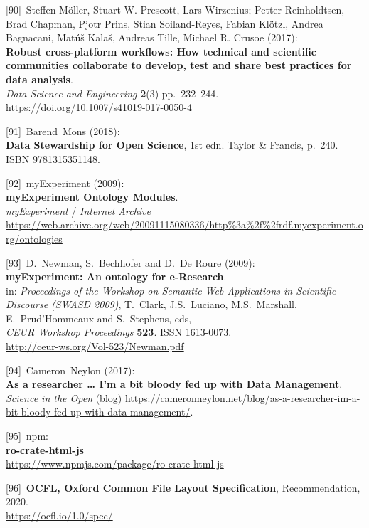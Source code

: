 {[}90{]}~Steffen Möller, Stuart W. Prescott, Lars Wirzenius; Petter
Reinholdtsen, Brad Chapman, Pjotr Prins, Stian Soiland-Reyes, Fabian
Klötzl, Andrea Bagnacani, Matúš Kalaš, Andreas Tille, Michael R. Crusoe
(2017):\\
\textbf{Robust cross-platform workflows: How technical and scientific
communities collaborate to develop, test and share best practices for
data analysis}.\\
\emph{Data Science and Engineering} \textbf{2}(3) pp.~232--244.\\
\url{https://doi.org/10.1007/s41019-017-0050-4}

{[}91{]}~Barend~Mons (2018):\\
\textbf{Data Stewardship for Open Science}, 1st edn. Taylor \& Francis,
p.~240. \href{https://identifiers.org/isbn/9781315351148}{ISBN
9781315351148}.

{[}92{]}~myExperiment (2009):\\
\textbf{myExperiment Ontology Modules}.\\
\emph{myExperiment} / \emph{Internet Archive}\\
\url{https://web.archive.org/web/20091115080336/http\%3a\%2f\%2frdf.myexperiment.org/ontologies}

{[}93{]}~D.~Newman, S.~Bechhofer and D.~De Roure (2009):\\
\textbf{myExperiment: An ontology for e-Research}.\\
in: \emph{Proceedings of the Workshop on Semantic Web Applications in
Scientific Discourse (SWASD 2009)}, T.~Clark, J.S.~Luciano,
M.S.~Marshall, E.~Prud'Hommeaux and S.~Stephens, eds,\\
\emph{CEUR Workshop Proceedings} \textbf{523}. ISSN 1613-0073.\\
\url{http://ceur-ws.org/Vol-523/Newman.pdf}

{[}94{]}~Cameron~Neylon (2017):\\
\textbf{As a researcher \ldots{} I'm a bit bloody fed up with Data
Management}.\\
\emph{Science in the Open} (blog)
\url{https://cameronneylon.net/blog/as-a-researcher-im-a-bit-bloody-fed-up-with-data-management/}.

{[}95{]}~npm:\\
\textbf{ro-crate-html-js}\\
\url{https://www.npmjs.com/package/ro-crate-html-js}

{[}96{]}~\textbf{OCFL, Oxford Common File Layout Specification},
Recommendation, 2020.\\
\url{https://ocfl.io/1.0/spec/}

